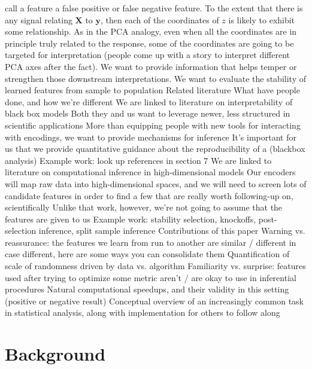 \documentclass[11pt]{article}
\begin{document}
\begin{outline}
      call a feature a false positive or false negative feature.
      \4 To the extent that there is any signal relating $\mathbf{X}$ to
      $\mathbf{y}$, then each of the coordinates of $z$ is likely to exhibit
      some relationship. As in the PCA analogy, even when all the coordinates
      are in principle truly related to the response, some of the coordinates
      are going to be targeted for interpretation (people come up with a story
      to interpret different PCA axes after the fact). We want to provide
      information that helps temper or strengthen those downstream
      interpretations.
    \3 We want to evaluate the stability of learned features from sample to
    population
\1 Related literature
  \2 What have people done, and how we're different
    \3 We are linked to literature on interpretability of black box models
      \4 Both they and us want to leverage newer, less structured in scientific
      applications
      \4 More than equipping people with new tools for interacting with
      encodings, we want to provide mechanisms for inference
      \4 It's important for us that we provide quantitative guidance about the
      reproducibility of a (blackbox analysis)
      \4 Example work: look up references in \citep{raghu2020survey} section 7
    \3 We are linked to literature on computational inference in
    high-dimensional models
      \4 Our encoders will map raw data into high-dimensional spaces, and we
      will need to screen lots of candidate features in order to find a few that
      are really worth following-up on, scientifically
      \4 Unlike that work, however, we're not going to assume that the features
      are given to us
      \4 Example work: stability selection, knockoffs, post-selection inference,
      split sample inference
\1 Contributions of this paper
  \2 Warning vs. reassurance: the features we learn from run to another are
  similar / different
    \3 in case different, here are some ways you can consolidate them
    \3 Quantification of scale of randomness driven by data vs. algorithm
  \2 Familiarity vs. surprise: features used after trying to optimize some
  metric aren't / are okay to use in inferential procedures
  \2 Natural computational speedups, and their validity in this setting
  (positive or negative result)
  \2 Conceptual overview of an increasingly common task in statistical
  analysis, along with implementation for others to follow along
\end{outline}

\section{Background}
\end{document}
